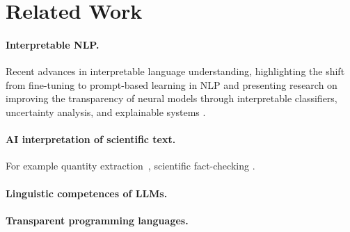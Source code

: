 \section{Related Work}
\label{sec:related}

\paragraph{Interpretable NLP.}

Recent advances in interpretable language understanding, highlighting the shift from fine-tuning to
prompt-based learning in NLP and presenting research on improving the transparency of neural models through
interpretable classifiers, uncertainty analysis, and explainable systems \cite{yulan23}.

\paragraph{AI interpretation of scientific text.}

For example quantity extraction~\cite{bolucu23}, scientific fact-checking
\cite{abu-ahmad25}.

\paragraph{Linguistic competences of LLMs.}

\paragraph{Transparent programming languages.}

\cite{atkey25,perera22,bond25,psallidas18smoke}
